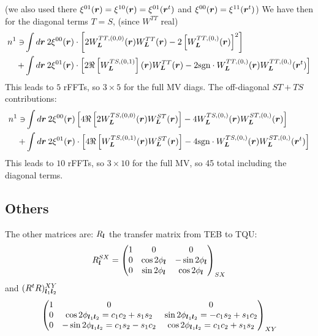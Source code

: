 \documentclass[11pt]{article}
\begin{document}
(we also used there $\xi^{01}(\boldsymbol{r}) = \xi^{10}(\boldsymbol{r}) = \xi^{01}(\boldsymbol{r}^t)$ and $\xi^{00}(\boldsymbol{r}) = \xi^{11}(\boldsymbol{r}^t)$)
We have then for the diagonal terms $T=S$, (since $W^{TT}$ real)
\begin{equation}
\begin{split}
	n^{1} \ni	&\int d\boldsymbol{r} \: 2\xi^{00}(\boldsymbol{r}) \cdot \left[2W_{\boldsymbol{L}}^{TT, (0, 0)}(\boldsymbol{r}) W_{\boldsymbol{L}}^{TT}(\boldsymbol{r})- 2 \left[W_{\boldsymbol{L}}^{TT, (0,)}(\boldsymbol{r})\right]^2\right] \\
	+&\int d\boldsymbol{r} \: 2\xi^{01}(\boldsymbol{r})\cdot\left[ 2 \Re\left[{W_{\boldsymbol{L}}^{TS, (0,1)}}\right](\boldsymbol{r}) W_{\boldsymbol{L}}^{TT}(\boldsymbol{r}) - 2\textrm{sgn}\cdot W_{\boldsymbol{L}}^{TT, (0,)}(\boldsymbol{r})W_{\boldsymbol{L}}^{TT, (0,)}(\boldsymbol{r}^t)\right]
	\end{split}
\end{equation}
This leads to $5$ rFFTs, so $3\times 5$ for the full MV diags. The off-diagonal $ST + TS $ contributions:
\begin{equation}
\begin{split}
n^{1} \ni	&\int d\boldsymbol{r} \:2 \xi^{00}(\boldsymbol{r})\left[ 4\Re \left[2W_{\boldsymbol{L}}^{TS, (0, 0)}(\boldsymbol{r}) W_{\boldsymbol{L}}^{ST}(\boldsymbol{r})\right]- 4 W_{\boldsymbol{L}}^{TS, (0,)}(\boldsymbol{r})W_{\boldsymbol{L}}^{ST, (0,)}(\boldsymbol{r})\right] \\
	+&\int d\boldsymbol{r} \: 2\xi^{01}(\boldsymbol{r})\cdot\left[ 4\Re\left[ W_{\boldsymbol{L}}^{TS, (0,1)}(\boldsymbol{r}) W_{\boldsymbol{L}}^{ST}(\boldsymbol{r})\right] - 4\textrm{sgn}\cdot W_{\boldsymbol{L}}^{TS, (0,)}(\boldsymbol{r})W_{\boldsymbol{L}}^{ST, (0,)}(\boldsymbol{r}^t)\right]
\end{split}
\end{equation}
This leads to $10 $ rFFTs, so $3\times 10$ for the full MV, so 45 total including the diagonal terms.

\subsection{Others}
The other matrices are: $R_{\boldsymbol{l}}$ the transfer matrix from TEB to TQU:
\begin{equation} R^{SX}_{\boldsymbol{l}} = 
	\begin{pmatrix}
		1 & 0 & 0 \\ 0 & \cos 2\phi_{\boldsymbol{l}} & -\sin 2\phi_{\boldsymbol{l}} \\ 0 & \sin 2\phi_{\boldsymbol{l}} & \cos 2\phi_{\boldsymbol{l}}
	\end{pmatrix}_{SX}
\end{equation}
and $(R^tR)^{XY}_{\boldsymbol{l}_1\boldsymbol{l}_2}$
\begin{equation}
		\begin{pmatrix}
		1 & 0 & 0 \\ 0 & \cos 2\phi_{\boldsymbol{l}_1\boldsymbol{l}_2}= c_1c_2 + s_1 s_2 & \sin 2\phi_{\boldsymbol{l}_1\boldsymbol{l}_2}= -c_1s_2 + s_1 c_2 \\ 0 & -\sin 2\phi_{\boldsymbol{l}_1\boldsymbol{l}_2}= c_1s_2 - s_1 c_2 & \cos 2\phi_{\boldsymbol{l}_1\boldsymbol{l}_2}= c_1c_2 + s_1 s_2
	\end{pmatrix}_{XY}
\end{equation}
\end{document}
